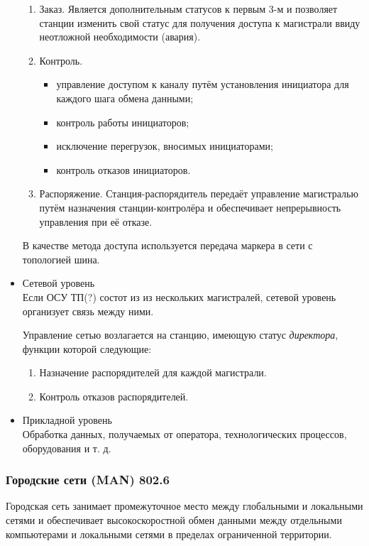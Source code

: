 \documentclass[12pt, russian, oneside, article]{ncc}
\begin{document}
\begin{itemize}
\begin{enumerate}
\item Заказ. Является дополнительным статусов к первым 3-м и позволяет станции изменить свой статус для получения доступа к магистрали ввиду неотложной необходимости (авария).
\item Контроль.

\begin{itemize}
\item управление доступом к каналу путём установления инициатора для каждого шага обмена данными;
\item контроль работы инициаторов;
\item исключение перегрузок, вносимых инициаторами;
\item контроль отказов инициаторов.
\end{itemize}

\item Распоряжение. Станция-распорядитель передаёт управление магистралью путём назначения станции-контролёра и обеспечивает непрерывность управления при её отказе.
\end{enumerate}

В качестве метода доступа используется передача маркера в сети с топологией шина.


\item Сетевой уровень\\
\label{sec-5_2_3_4}%
Если ОСУ ТП(?) состот из из нескольких магистралей, сетевой уровень организует связь между ними.

Управление сетью возлагается на станцию, имеющую статус \emph{директора}, функции которой следующие:
\begin{enumerate}
\item Назначение распорядителей для каждой магистрали.
\item Контроль отказов распорядителей.
\end{enumerate}


\item Прикладной уровень\\
\label{sec-5_2_3_5}%
Обработка данных, получаемых от оператора, технологических процессов, оборудования и т. д.

\end{itemize} %
\subsubsection{Городские сети (MAN) 802.6}
\label{sec-5_2_4}


Городская сеть занимает промежуточное место между глобальными и локальными сетями и обеспечивает высокоскоростной обмен данными между отдельными компьютерами и локальными сетями в пределах ограниченной территории.
\end{document}
